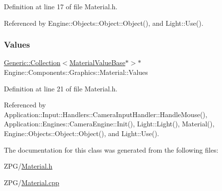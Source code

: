 Definition at line 17 of file Material.\+h.



Referenced by Engine\+::\+Objects\+::\+Object\+::\+Object(), and Light\+::\+Use().

\mbox{\label{classEngine_1_1Components_1_1Graphics_1_1Material_a34335608ba1e6eb2c2dba5032107eab0}} 
\subsubsection{\texorpdfstring{Values}{Values}}
{\footnotesize\ttfamily \mbox{\hyperlink{classGeneric_1_1Collection}{Generic\+::\+Collection}}$<$\mbox{\hyperlink{classEngine_1_1Components_1_1Graphics_1_1MaterialValueBase}{Material\+Value\+Base}}$\ast$$>$$\ast$ Engine\+::\+Components\+::\+Graphics\+::\+Material\+::\+Values}



Definition at line 21 of file Material.\+h.



Referenced by Application\+::\+Input\+::\+Handlers\+::\+Camera\+Input\+Handler\+::\+Handle\+Mouse(), Application\+::\+Engines\+::\+Camera\+Engine\+::\+Init(), Light\+::\+Light(), Material(), Engine\+::\+Objects\+::\+Object\+::\+Object(), and Light\+::\+Use().



The documentation for this class was generated from the following files\+:\begin{DoxyCompactItemize}
\item 
Z\+P\+G/\mbox{\hyperlink{Material_8h}{Material.\+h}}\item 
Z\+P\+G/\mbox{\hyperlink{Material_8cpp}{Material.\+cpp}}\end{DoxyCompactItemize}
